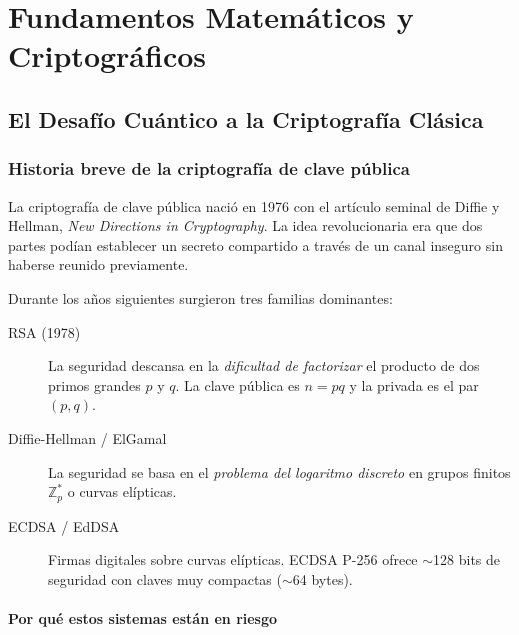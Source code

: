\documentclass[12pt,a4paper,twoside,openright]{book}
\theoremstyle{plain}
\theoremstyle{definition}
\theoremstyle{remark}
\newcommand{\Z}{\mathbb{Z}}
\begin{document}
\mainmatter

\part{Fundamentos Matem\'aticos y Criptogr\'aficos}

\chapter{El Desaf\'io Cu\'antico a la Criptograf\'ia Cl\'asica}
\label{chap:desafio}

\section{Historia breve de la criptograf\'ia de clave p\'ublica}

La criptograf\'ia de clave p\'ublica naci\'o en 1976 con el art\'iculo
seminal de Diffie y Hellman, \textit{New Directions in Cryptography}. La idea
revolucionaria era que dos partes pod\'ian establecer un secreto compartido
a trav\'es de un canal inseguro sin haberse reunido previamente.

\medskip
Durante los a\~nos siguientes surgieron tres familias dominantes:

\begin{description}
  \item[RSA (1978)] La seguridad descansa en la \emph{dificultad de factorizar}
    el producto de dos primos grandes $p$ y $q$. La clave p\'ublica es $n = pq$
    y la privada es el par $(p, q)$.
  \item[Diffie-Hellman / ElGamal] La seguridad se basa en el
    \emph{problema del logaritmo discreto} en grupos finitos $\Z_p^*$ o
    curvas el\'ipticas.
  \item[ECDSA / EdDSA] Firmas digitales sobre curvas el\'ipticas. ECDSA P-256
    ofrece $\sim$128 bits de seguridad con claves muy compactas ($\sim$64 bytes).
\end{description}

\subsection{Por qu\'e estos sistemas est\'an en riesgo}
\end{document}
